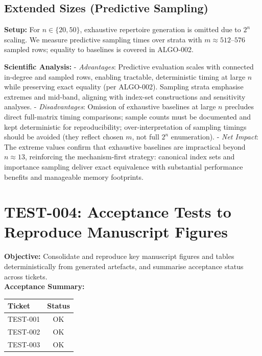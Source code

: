 \documentclass[11pt]{article}
\begin{document}
\subsection*{Extended Sizes (Predictive Sampling)}
\textbf{Setup:} For $n\in\{20,50\}$, exhaustive repertoire generation is omitted due to $2^n$ scaling. We measure predictive sampling times over strata with $m\approx 512$--$576$ sampled rows; equality to baselines is covered in ALGO-002.\\
\begin{center}
\end{center}
\textbf{Scientific Analysis:}
- \emph{Advantages}: Predictive evaluation scales with connected in-degree and sampled rows, enabling tractable, deterministic timing at large $n$ while preserving exact equality (per ALGO-002). Sampling strata emphasise extremes and mid-band, aligning with index-set constructions and sensitivity analyses.
- \emph{Disadvantages}: Omission of exhaustive baselines at large $n$ precludes direct full-matrix timing comparisons; sample counts must be documented and kept deterministic for reproducibility; over-interpretation of sampling timings should be avoided (they reflect chosen $m$, not full $2^n$ enumeration).
- \emph{Net Impact}: The extreme values confirm that exhaustive baselines are impractical beyond $n\approx 13$, reinforcing the mechanism-first strategy: canonical index sets and importance sampling deliver exact equivalence with substantial performance benefits and manageable memory footprints.


\section{TEST-004: Acceptance Tests to Reproduce Manuscript Figures}
\textbf{Objective:} Consolidate and reproduce key manuscript figures and tables deterministically from generated artefacts, and summarise acceptance status across tickets.\\
\textbf{Acceptance Summary:}\\
\begin{center}
\begin{tabular}{lc}
\toprule
Ticket & Status \\
\midrule
TEST-001 & OK \\
TEST-002 & OK \\
TEST-003 & OK \\
\bottomrule
\end{tabular}
\end{center}
\end{document}
